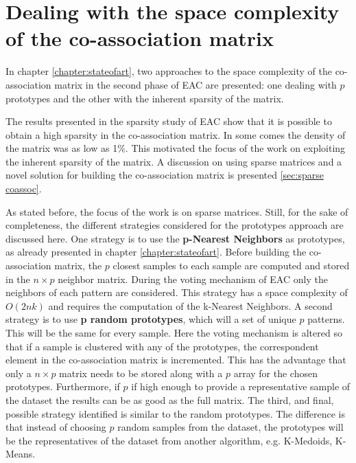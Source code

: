 
\section{Dealing with the space complexity of the co-association matrix}

In chapter \ref{chapter:stateofart}, two approaches to the space complexity of the co-association matrix in the second phase of EAC are presented: one dealing with $p$ prototypes and the other with the inherent sparsity of the matrix. 

The results presented in the sparsity study of EAC \cite{Lourenco2010} show that it is possible to obtain a high sparsity in the co-association matrix.
In some comes the density of the matrix was as low as 1\%.
This motivated the focus of the work on exploiting the inherent sparsity of the matrix.
A discussion on using sparse matrices and a novel solution for building the co-association matrix is presented \ref{sec:sparse coassoc}.

As stated before, the focus of the work is on sparse matrices.
Still, for the sake of completeness, the different strategies considered for the prototypes approach are discussed here.
One strategy is to use the \textbf{p-Nearest Neighbors} as prototypes, as already presented in chapter \ref{chapter:stateofart}.
Before building the co-association matrix, the $p$ closest samples to each sample are computed and stored in the $n \times p$ neighbor matrix.
During the voting mechanism of EAC only the neighbors of each pattern are considered.
This strategy has a space complexity of $O(2nk)$ and requires the computation of the k-Nearest Neighbors.
A second strategy is to use \textbf{p random prototypes}, which will a set of unique $p$ patterns.
This will be the same for every sample.
Here the voting mechanism is altered so that if a sample is clustered with any of the prototypes, the correspondent element in the co-association matrix is incremented.
This has the advantage that only a $n \times p$ matrix needs to be stored along with a $p$ array for the chosen prototypes.
Furthermore, if $p$ if high enough to provide a representative sample of the dataset the results can be as good as the full matrix.
The third, and final, possible strategy identified is similar to the random prototypes.
The difference is that instead of choosing $p$ random samples from the dataset, the prototypes will be the representatives of the dataset from another algorithm, e.g. K-Medoids, K-Means.

